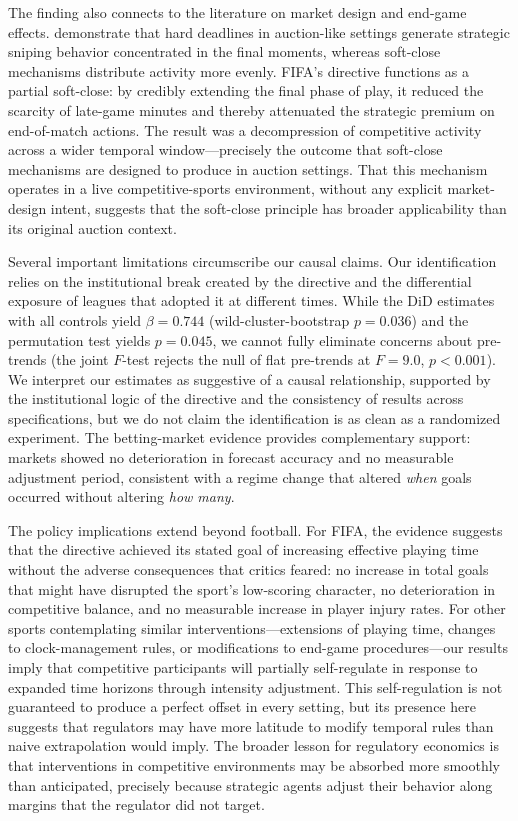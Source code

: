 The finding also connects to the literature on market design and
end-game effects. \citet{Roth2002} demonstrate that hard deadlines in
auction-like settings generate strategic sniping behavior concentrated in
the final moments, whereas soft-close mechanisms distribute activity more
evenly. FIFA's directive functions as a partial soft-close: by
credibly extending the final phase of play, it reduced the scarcity
of late-game minutes and thereby attenuated the strategic premium on
end-of-match actions. The result was a decompression of competitive
activity across a wider temporal window---precisely the outcome that
soft-close mechanisms are designed to produce in auction settings. That
this mechanism operates in a live competitive-sports environment,
without any explicit market-design intent, suggests that the
soft-close principle has broader applicability than its original auction
context.

Several important limitations circumscribe our causal claims. Our
identification relies on the institutional break created by the directive
and the differential exposure of leagues that adopted it at different
times. While the DiD estimates with all controls yield $\beta = 0.744$
(wild-cluster-bootstrap $p = 0.036$) and the permutation test yields $p =
0.045$, we cannot fully eliminate concerns about pre-trends (the joint
$F$-test rejects the null of flat pre-trends at $F = 9.0$, $p < 0.001$).
We interpret our estimates as suggestive of a causal relationship,
supported by the institutional logic of the directive and the consistency
of results across specifications, but we do not claim the identification
is as clean as a randomized experiment. The betting-market evidence
provides complementary support: markets showed no deterioration in
forecast accuracy and no measurable adjustment period, consistent with a
regime change that altered \emph{when} goals occurred without altering
\emph{how many}.

The policy implications extend beyond football. For FIFA, the evidence
suggests that the directive achieved its stated goal of increasing
effective playing time without the adverse consequences that critics
feared: no increase in total goals that might have disrupted the sport's
low-scoring character, no deterioration in competitive balance, and no
measurable increase in player injury rates. For other sports
contemplating similar interventions---extensions of playing time, changes
to clock-management rules, or modifications to end-game
procedures---our results imply that competitive participants will
partially self-regulate in response to expanded time horizons through
intensity adjustment. This self-regulation is not guaranteed to produce a
perfect offset in every setting, but its presence here suggests that
regulators may have more latitude to modify temporal rules than naive
extrapolation would imply. The broader lesson for regulatory economics is
that interventions in competitive environments may be absorbed more
smoothly than anticipated, precisely because strategic agents adjust their
behavior along margins that the regulator did not target.

